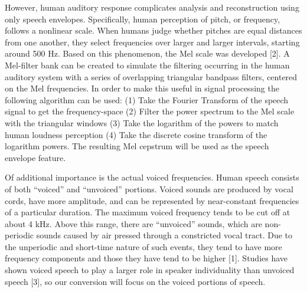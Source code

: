 \documentclass{article}
\begin{document}
However, human auditory response complicates analysis and reconstruction using only speech envelopes. Specifically, human perception of pitch, or frequency, follows a nonlinear scale. When humans judge whether pitches are equal distances from one another, they select frequencies over larger and larger intervals, starting around 500 Hz. Based on this phenomenon, the Mel scale was developed [2]. A Mel-filter bank can be created to simulate the filtering occurring in the human auditory system with a series of overlapping triangular bandpass filters, centered on the Mel frequencies. In order to make this useful in signal processing the following algorithm can be used:
(1)  Take the Fourier Transform of the speech signal to get the frequency-space
(2)  Filter the power spectrum to the Mel scale with the triangular windows
(3)  Take the logarithm of the powers to match human loudness perception
(4)  Take the discrete cosine transform of the logarithm powers.
 The resulting Mel cepstrum will be used as the speech envelope feature.
 
Of additional importance is the actual voiced frequencies. Human speech consists of both ``voiced'' and ``unvoiced'' portions. Voiced sounds are produced by vocal cords, have more amplitude, and can be represented by near-constant frequencies of a particular duration. The maximum voiced frequency tends to be cut off at about 4 kHz. Above this range, there are ``unvoiced'' sounds, which are non-periodic sounds caused by air pressed through a constricted vocal tract. Due to the unperiodic and short-time nature of such events, they tend to have more frequency components and those they have tend to be higher [1]. Studies have shown voiced speech to play a larger role in speaker individuality than unvoiced speech [3], so our conversion will focus on the voiced portions of speech.
\end{document}
